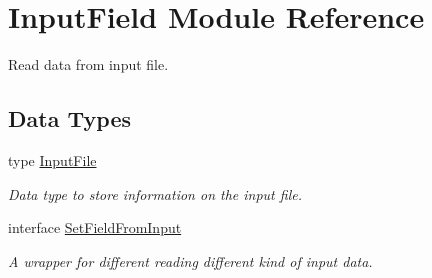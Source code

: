 \hypertarget{namespace_input_field}{
\section{InputField Module Reference}
\label{namespace_input_field}
}


Read data from input file.  
\subsection*{Data Types}
\begin{DoxyCompactItemize}
\item 
type \hyperlink{type_input_field_1_1_input_file}{InputFile}
\begin{DoxyCompactList}\small\item\em Data type to store information on the input file. \item\end{DoxyCompactList}\item 
interface \hyperlink{interface_input_field_1_1_set_field_from_input}{SetFieldFromInput}
\begin{DoxyCompactList}\small\item\em A wrapper for different reading different kind of input data. \item\end{DoxyCompactList}\end{DoxyCompactItemize}
